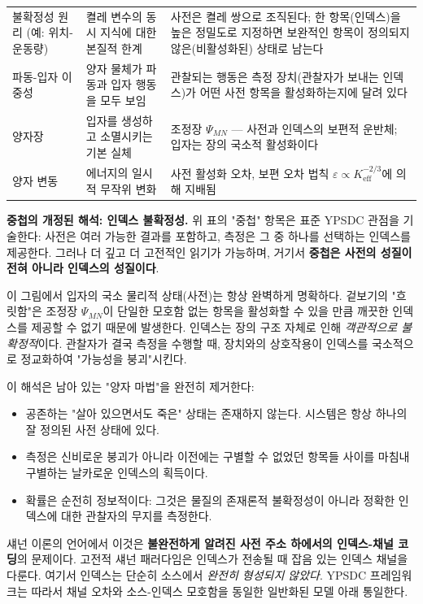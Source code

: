 \documentclass[12pt,a4paper]{article}
\begin{document}
\begin{longtable}{p{3.5cm} p{5cm} p{7cm}}
		불확정성 원리 (예: 위치-운동량) & 
		켤레 변수의 동시 지식에 대한 본질적 한계 & 
		사전은 켤레 쌍으로 조직된다; 한 항목(인덱스)을 높은 정밀도로 지정하면 보완적인 항목이 정의되지 않은(비활성화된) 상태로 남는다 \\
		
		파동-입자 이중성 & 
		양자 물체가 파동과 입자 행동을 모두 보임 & 
		관찰되는 행동은 측정 장치(관찰자가 보내는 인덱스)가 어떤 사전 항목을 활성화하는지에 달려 있다 \\
		
		양자장 & 
		입자를 생성하고 소멸시키는 기본 실체 & 
		조정장 \(\Psi_{MN}\) — 사전과 인덱스의 보편적 운반체; 입자는 장의 국소적 활성화이다 \\
		
		양자 변동 & 
		에너지의 일시적 무작위 변화 & 
		사전 활성화 오차, 보편 오차 법칙 \(\varepsilon \propto K_{\mathrm{eff}}^{-2/3}\)에 의해 지배됨 \\
		
	\end{longtable}
	
	\noindent
	\textbf{중첩의 개정된 해석: 인덱스 불확정성.}
	위 표의 "중첩" 항목은 표준 YPSDC 관점을 기술한다: 사전은 여러 가능한 결과를 포함하고, 측정은 그 중 하나를 선택하는 인덱스를 제공한다. 그러나 더 깊고 더 고전적인 읽기가 가능하며, 거기서 \textbf{중첩은 사전의 성질이 전혀 아니라 인덱스의 성질이다}.
	
	이 그림에서 입자의 국소 물리적 상태(사전)는 항상 완벽하게 명확하다. 겉보기의 "흐릿함"은 조정장 $\Psi_{MN}$이 단일한 모호함 없는 항목을 활성화할 수 있을 만큼 깨끗한 인덱스를 제공할 수 없기 때문에 발생한다. 인덱스는 장의 구조 자체로 인해 \emph{객관적으로 불확정적}이다. 관찰자가 결국 측정을 수행할 때, 장치와의 상호작용이 인덱스를 국소적으로 정교화하여 "가능성을 붕괴"시킨다.
	
	이 해석은 남아 있는 "양자 마법"을 완전히 제거한다:
	\begin{itemize}[leftmargin=*]
		\item 공존하는 "살아 있으면서도 죽은" 상태는 존재하지 않는다. 시스템은 항상 하나의 잘 정의된 사전 상태에 있다.
		\item 측정은 신비로운 붕괴가 아니라 이전에는 구별할 수 없었던 항목들 사이를 마침내 구별하는 날카로운 인덱스의 획득이다.
		\item 확률은 순전히 정보적이다: 그것은 물질의 존재론적 불확정성이 아니라 정확한 인덱스에 대한 관찰자의 무지를 측정한다.
	\end{itemize}
	
	섀넌 이론의 언어에서 이것은 \textbf{불완전하게 알려진 사전 주소 하에서의 인덱스-채널 코딩}의 문제이다. 고전적 섀넌 패러다임은 인덱스가 전송될 때 잡음 있는 인덱스 채널을 다룬다. 여기서 인덱스는 단순히 소스에서 \emph{완전히 형성되지 않았다}. YPSDC 프레임워크는 따라서 채널 오차와 소스-인덱스 모호함을 동일한 일반화된 모델 아래 통일한다.
	
\end{document}
